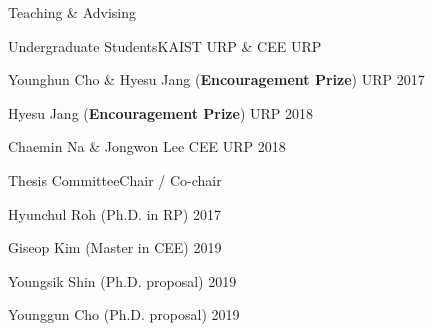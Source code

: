 \begin{rSection}{Teaching \& Advising}
\newpage
\begin{rSubsection}{Undergraduate Students}{}{KAIST \acf{URP} \& CEE URP}{}
  \item Younghun Cho \& Hyesu Jang ({\bf Encouragement Prize}) \hfill URP 2017
  \item Hyesu Jang ({\bf Encouragement Prize}) \hfill URP 2018
  \item Chaemin Na \& Jongwon Lee \hfill CEE URP 2018
\end{rSubsection}

\begin{rSubsection}{Thesis Committee}{}{Chair / Co-chair }{}
  \item Hyunchul Roh (Ph.D. in \ac{RP}) \hfill 2017
  \item Giseop Kim (Master in \ac{CEE}) \hfill 2019
  \item Youngsik Shin (Ph.D. proposal) \hfill 2019
  \item Younggun Cho (Ph.D. proposal) \hfill 2019
\end{rSubsection}

\end{rSection}

